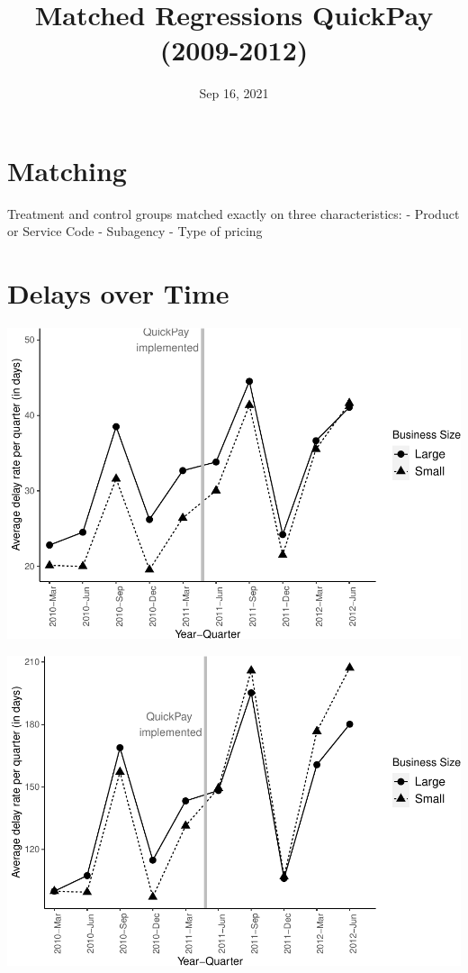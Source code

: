 \documentclass[
]{article}
\title{Matched Regressions QuickPay (2009-2012)}
\author{}
\date{\vspace{-2.5em}Sep 16, 2021}
\begin{document}
\maketitle

\hypertarget{matching}{%
\section{Matching}\label{matching}}

Treatment and control groups matched exactly on three characteristics: -
Product or Service Code - Subagency - Type of pricing

\hypertarget{delays-over-time}{%
\section{Delays over Time}\label{delays-over-time}}

\includegraphics{qp_first_matched_files/figure-latex/plot-1.pdf}

\includegraphics{qp_first_matched_files/figure-latex/normalized_plot-1.pdf}
\end{document}
